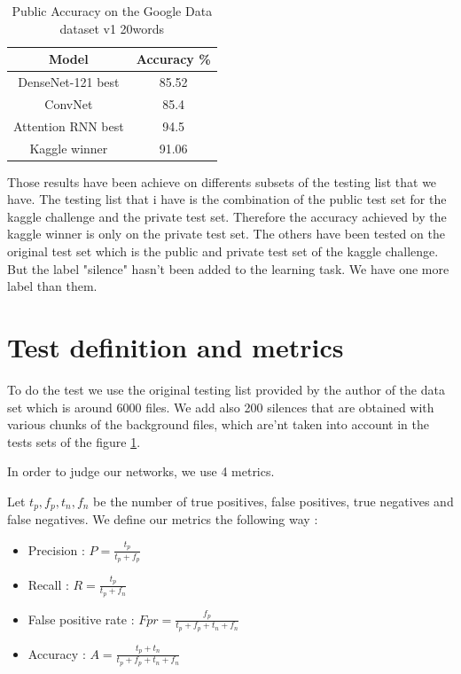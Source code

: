 
\begin{table}[h!]
    \centering
    \begin{tabular}{|c|c|}
        
        
        \hline
        Model & Accuracy \%  \\
        \hline
        DenseNet-121 best & 85.52 \\
        \hline
        ConvNet & 85.4 \\
        \hline
        Attention RNN best & 94.5 \\
        \hline
        Kaggle winner & 91.06\\
        \hline        
    \end{tabular}
    \caption{Public Accuracy on the Google Data dataset v1 20words \cite{ATTRNN}}
    \label{tab:general}
\end{table}

Those results have been achieve on differents subsets of the testing list that we have. The testing list that i have is the combination of the public test set for the kaggle challenge and the private test set. Therefore the accuracy achieved by the kaggle winner is only on the private test set. The others have been tested on the original test set which is the public and private test set of the kaggle challenge. But the label "silence" hasn't been added to the learning task. We have one more label than them.


\section{Test definition and metrics}


To do the test we use the original testing list provided by the author of the data set which is around 6000 files. We add also 200 silences that are obtained with various chunks of the background files, which are'nt taken into account in the tests sets of the figure \ref{tab:general}.

\vspace{5mm}
In order to judge our networks, we use 4 metrics.

\vspace{5mm}

Let $t_p, f_p, t_n, f_n$ be the number of true positives, false positives, true negatives and false negatives. We define our metrics the following way :

\begin{itemize}
    \item Precision : $P = \frac{t_p}{t_p + f_p}$
    \item Recall : $R = \frac{t_p}{t_p + f_n}$
    \item False positive rate : $Fpr = \frac{f_p}{t_p + f_p + t_n + f_n}$
    \item Accuracy : $A = \frac{t_p + t_n}{t_p + f_p + t_n + f_n}$
\end{itemize}

